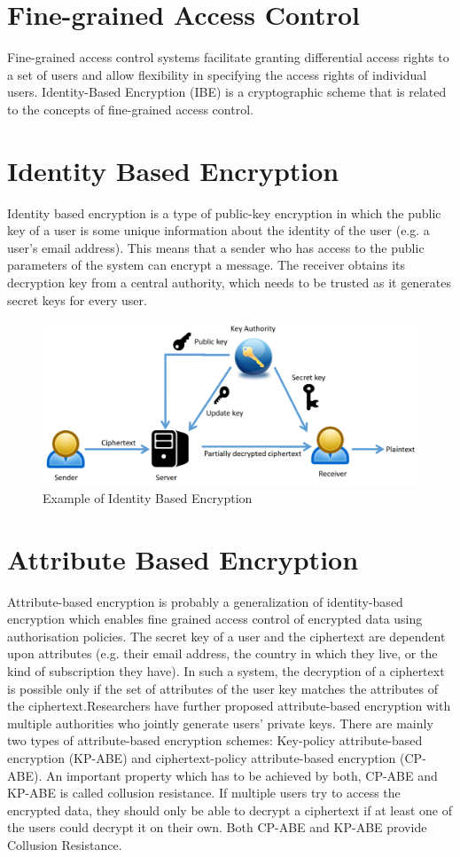 \section{Fine-grained Access Control}
Fine-grained access control systems facilitate granting differential access rights to a set of users and allow flexibility in specifying the access rights of individual users. Identity-Based Encryption (IBE) is a cryptographic scheme that is related to the concepts of fine-grained access control.

\section{Identity Based Encryption}
Identity based encryption is a type of public-key encryption in which the public key of a user is some unique information about the identity of the user (e.g. a user's email address). This means that a sender who has access to the public parameters of the system can encrypt a message. The receiver obtains its decryption key from a central authority, which needs to be trusted as it generates secret keys for every user. 

\begin{figure}[h]
    \centering
   \includegraphics[width=\linewidth]{Images/IBEV2.png}
    \caption{Example of Identity Based Encryption}
    \label{fig:enter-label}
\end{figure}

\section{Attribute Based Encryption}
Attribute-based encryption is probably a generalization of identity-based encryption which enables fine grained access control of encrypted data using authorisation policies. The secret key of a user and the ciphertext are dependent upon attributes (e.g. their email address, the country in which they live, or the kind of subscription they have). In such a system, the decryption of a ciphertext is possible only if the set of attributes of the user key matches the attributes of the ciphertext.Researchers have further proposed attribute-based encryption with multiple authorities who jointly generate users' private keys. There are mainly two types of attribute-based encryption schemes: Key-policy attribute-based encryption (KP-ABE) and ciphertext-policy attribute-based encryption (CP-ABE).
An important property which has to be achieved by both, CP-ABE and KP-ABE is called collusion resistance. If multiple users try to access the encrypted data, they should only be able to decrypt a ciphertext if at least one of the users could decrypt it on their own. Both CP-ABE and KP-ABE provide Collusion Resistance.
